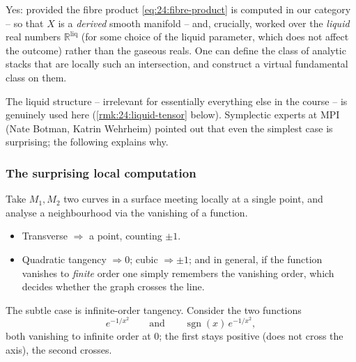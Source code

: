 \begin{theorem}
\label{thm:24:vfc-exists}
Yes: provided the fibre product \eqref{eq:24:fibre-product} is computed in our
category -- so that $X$ is a \emph{derived} smooth manifold -- and, crucially,
worked over the \emph{liquid} real numbers $\mathbb R^{\mathrm{liq}}$ (for some
choice of the liquid parameter, which does not affect the outcome) rather than the
gaseous reals. One can define the class of analytic stacks that are locally such
an intersection, and construct a virtual fundamental class on them.
\end{theorem}

The liquid structure -- irrelevant for essentially everything else in the course
-- is genuinely used here (\cref{rmk:24:liquid-tensor} below). Symplectic experts
at MPI (Nate Botman, Katrin Wehrheim) pointed out that even the simplest case is
surprising; the following explains why.

\subsubsection*{The surprising local computation}

Take $M_1,M_2$ two curves in a surface meeting locally at a single point, and
analyse a neighbourhood via the vanishing of a function.
\begin{itemize}
\item Transverse $\Rightarrow$ a point, counting $\pm1$.
\item Quadratic tangency $\Rightarrow 0$; cubic $\Rightarrow \pm1$; and in general,
if the function vanishes to \emph{finite} order one simply remembers the vanishing
order, which decides whether the graph crosses the line.
\end{itemize}
The subtle case is infinite-order tangency. Consider the two functions
\begin{equation*}
e^{-1/x^2}\qquad\text{and}\qquad \operatorname{sgn}(x)\,e^{-1/x^2},
\end{equation*}
both vanishing to infinite order at $0$; the first stays positive (does not cross
the axis), the second crosses.

